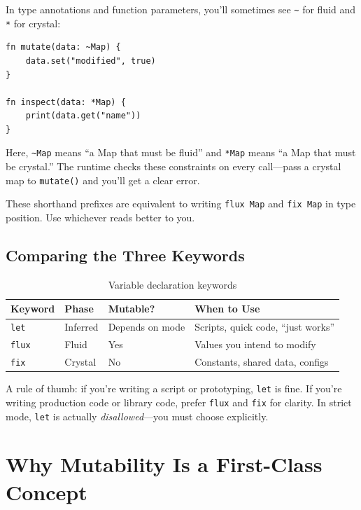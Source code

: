 In type annotations and function parameters, you'll sometimes see \lstinline|~| for fluid and \lstinline|*| for crystal:

\begin{lstlisting}[language=Lattice, caption={Phase shorthand in function parameters}]
fn mutate(data: ~Map) {
    data.set("modified", true)
}

fn inspect(data: *Map) {
    print(data.get("name"))
}
\end{lstlisting}

Here, \lstinline|~Map| means ``a Map that must be fluid'' and \lstinline|*Map| means ``a Map that must be crystal.''
The runtime checks these constraints on every call---pass a crystal map to \lstinline|mutate()| and you'll get a clear error.

These shorthand prefixes are equivalent to writing \lstinline|flux Map| and \lstinline|fix Map| in type position.
Use whichever reads better to you.

\subsection{Comparing the Three Keywords}\label{subsec:comparing-keywords}

\begin{table}[h]
\centering
\begin{tabular}{llll}
\toprule
\textbf{Keyword} & \textbf{Phase} & \textbf{Mutable?} & \textbf{When to Use} \\
\midrule
\lstinline|let|  & Inferred   & Depends on mode & Scripts, quick code, ``just works'' \\
\lstinline|flux| & Fluid      & Yes             & Values you intend to modify \\
\lstinline|fix|  & Crystal    & No              & Constants, shared data, configs \\
\bottomrule
\end{tabular}
\caption{Variable declaration keywords}\label{tab:declaration-keywords}
\end{table}

A rule of thumb: if you're writing a script or prototyping, \lstinline|let| is fine.
If you're writing production code or library code, prefer \lstinline|flux| and \lstinline|fix| for clarity.
In strict mode, \lstinline|let| is actually \emph{disallowed}---you must choose explicitly.

\section{Why Mutability Is a First-Class Concept}\label{sec:mutability-first-class}

